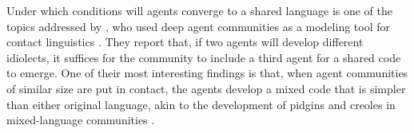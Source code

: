 Under which conditions will agents converge to a shared language is
one of the topics addressed by , who used deep agent communities as a
modeling tool for contact linguistics
\cite{MyersScotton:2002}. They report that,
if two agents will develop different idiolects, it suffices for
the community to include a third agent for a shared code to
emerge. One of their most interesting findings is that, when agent
communities of similar size are put in contact, the agents develop a
mixed code that is simpler than either original language, akin
to the development of pidgins and creoles in mixed-language
communities \cite{Bakker:etal:2011}.


